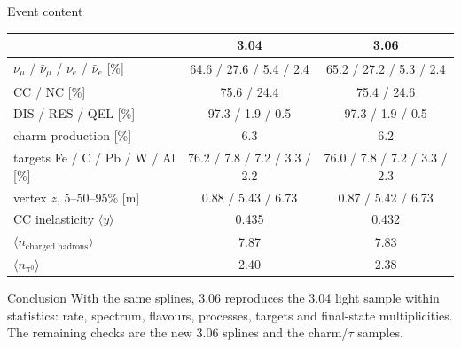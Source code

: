 \documentclass[10pt,aspectratio=169]{beamer}
\begin{document}
\begin{frame}{Event content}
  \centering\footnotesize
  \begin{tabular}{@{}lcc@{}}
    \toprule
    & 3.04 & 3.06 \\
    \midrule
    $\nu_\mu$ / $\bar\nu_\mu$ / $\nu_e$ / $\bar\nu_e$ [\%] & 64.6 / 27.6 / 5.4 / 2.4 & 65.2 / 27.2 / 5.3 / 2.4 \\
    CC / NC [\%] & 75.6 / 24.4 & 75.4 / 24.6 \\
    DIS / RES / QEL [\%] & 97.3 / 1.9 / 0.5 & 97.3 / 1.9 / 0.5 \\
    charm production [\%] & 6.3 & 6.2 \\
    targets Fe / C / Pb / W / Al [\%] & 76.2 / 7.8 / 7.2 / 3.3 / 2.2 & 76.0 / 7.8 / 7.2 / 3.3 / 2.3 \\
    vertex $z$, 5--50--95\% [m] & 0.88 / 5.43 / 6.73 & 0.87 / 5.42 / 6.73 \\
    CC inelasticity $\langle y \rangle$ & 0.435 & 0.432 \\
    $\langle n_\text{charged hadrons}\rangle$ & 7.87 & 7.83 \\
    $\langle n_{\pi^0}\rangle$ & 2.40 & 2.38 \\
    \bottomrule
  \end{tabular}
  \vspace{0.8em}
  \begin{exampleblock}{Conclusion}\small
    With the same splines, 3.06 reproduces the 3.04 light sample within statistics: rate, spectrum,
    flavours, processes, targets and final-state multiplicities. The remaining checks are the
    new 3.06 splines and the charm/$\tau$ samples.
  \end{exampleblock}
\end{frame}
\end{document}
